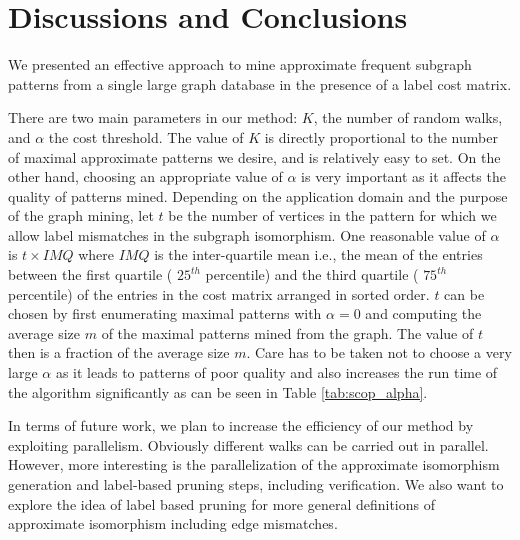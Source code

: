 \section{Discussions and Conclusions}
\label{sec:conclusions}

We presented an effective approach to mine approximate frequent subgraph
patterns from a single large graph database in the presence of
a label cost matrix.

There are two main parameters in our method: $K$, the number of random
walks, and $\alpha$ the cost threshold. The value of $K$ is directly
proportional to the number of maximal approximate patterns we desire,
and is relatively easy to set.
On the other hand, choosing an appropriate value of
$\alpha$ is very important as it affects the quality of
patterns mined. Depending on the application domain
and the purpose of the graph mining, let $t$ be the number of
vertices in the pattern for which we allow label mismatches
in the subgraph isomorphism. One reasonable value of
$\alpha$ is $t \times IMQ$ where $IMQ$ is the inter-quartile mean
i.e., the mean of the entries between the first quartile ( $25^{th}$
percentile) and the third quartile ( $75^{th}$ percentile)
of the entries in the cost matrix arranged in sorted order. 
$t$ can be chosen by first
enumerating maximal patterns with $\alpha = 0$ and computing the 
average size $m$ of the maximal patterns mined from the graph.
The value of $t$ then is a fraction of the average size $m$.
Care has to be taken not to choose a very large $\alpha$ as it leads to
patterns of poor quality and also increases the run time of the
algorithm significantly as can be seen in Table \ref{tab:scop_alpha}.

In terms of future work, we plan to increase the efficiency of our
method by exploiting parallelism. Obviously different walks can be
carried out in parallel. However, more interesting is the
parallelization of the approximate isomorphism generation and
label-based pruning steps, including verification. We also
want to explore the idea of label based pruning for more
general definitions of approximate isomorphism including 
edge mismatches.

